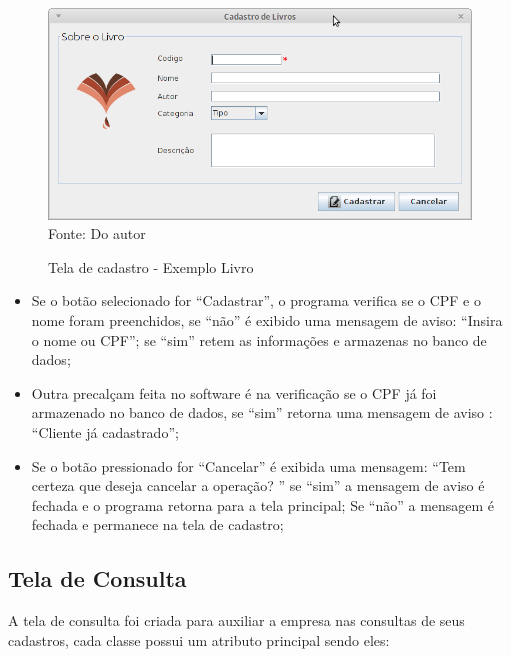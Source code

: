 \begin{figure}[H]
	\centering 
	\caption{Tela de cadastro - Exemplo Livro}
	\label{cadastro_livro}
	\includegraphics[scale = 0.6]{imagens/cadastrar-livro.png}
	\\Fonte: Do autor
\end{figure}


\begin{itemize}
 \item Se o botão selecionado for “Cadastrar”, o programa verifica se o  CPF e o nome foram preenchidos, se “não” é exibido uma mensagem de aviso: “Insira o nome ou CPF”; se “sim” retem as informações e armazenas no banco de dados;

 \item Outra precalçam feita no software é na verificação se o CPF já foi armazenado no banco de dados, se “sim” retorna uma mensagem de aviso : “Cliente já cadastrado”;

  \item Se o botão pressionado for “Cancelar”  é exibida uma mensagem: “Tem certeza que deseja cancelar a operação? ” se “sim” a mensagem de aviso é fechada e o programa retorna para a tela principal; Se “não” a mensagem é fechada e permanece na tela de cadastro;

\end{itemize}




\subsection{Tela de Consulta}

A  tela de consulta foi criada para auxiliar a empresa nas consultas de seus cadastros, cada classe possui
um atributo principal sendo eles: 


